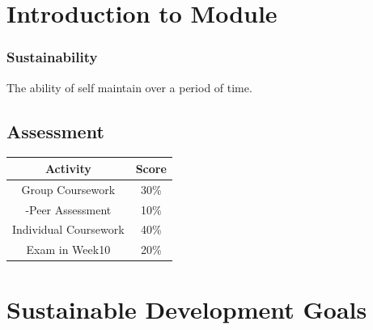 \documentclass{NoteThesis/note-thesis}
\begin{document}
\maketitle

\tableofcontents

\newpage

\section{Introduction to Module}

\subsubsection*{Sustainability}

The ability of self maintain over a period of time.

\subsection*{Assessment}

\begin{table}[h]
    \centering
    \begin{tabular}{cc}
        \hline
        Activity & Score\\
        \hline
        Group Coursework & 30\%\\
        -Peer Assessment & 10\%\\
        Individual Coursework & 40\%\\
        Exam in Week10 & 20\%\\ 
        \hline
    \end{tabular}
\end{table}

\section{Sustainable Development Goals}
\end{document}

